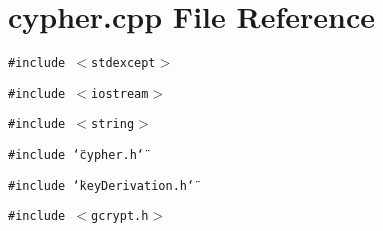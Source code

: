 \section{cypher.cpp File Reference}
\label{cypher_8cpp}
{\tt \#include $<$stdexcept$>$}\par
{\tt \#include $<$iostream$>$}\par
{\tt \#include $<$string$>$}\par
{\tt \#include \char`\"{}cypher.h\char`\"{}}\par
{\tt \#include \char`\"{}key\-Derivation.h\char`\"{}}\par
{\tt \#include $<$gcrypt.h$>$}\par
